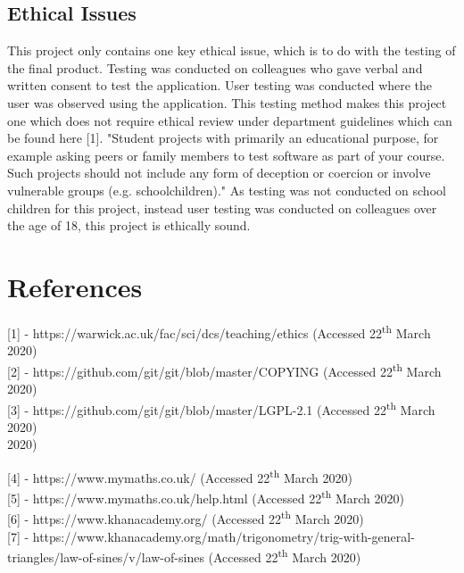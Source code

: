 \documentclass{article}
\begin{document}
\subsection{Ethical Issues}

This project only contains one key ethical issue, which is to do with the testing of the final product. Testing was conducted on colleagues who gave verbal and written consent to test the application. User testing was conducted where the user was observed using the application. This testing method makes this project one which does not require ethical review under department guidelines which can be found here [1]. "Student projects with primarily an educational purpose, for example asking peers or family members to test software as part of your course. Such projects should not include any form of deception or coercion or involve vulnerable groups (e.g. schoolchildren)." As testing was not conducted on school children for this project, instead user testing was conducted on colleagues over the age of 18, this project is ethically sound. 

\section{References}
\label{section:references}

[1] - https://warwick.ac.uk/fac/sci/dcs/teaching/ethics (Accessed 22\textsuperscript{th} March 2020) \\ 

[2] - https://github.com/git/git/blob/master/COPYING (Accessed 22\textsuperscript{th} March 2020) \\ 

[3] - https://github.com/git/git/blob/master/LGPL-2.1 (Accessed 22\textsuperscript{th} March 2020) \\  2020)

[4] - https://www.mymaths.co.uk/ (Accessed 22\textsuperscript{th} March 2020) \\ 

[5] - https://www.mymaths.co.uk/help.html (Accessed 22\textsuperscript{th} March 2020) \\

[6] - https://www.khanacademy.org/ (Accessed 22\textsuperscript{th} March 2020) \\

[7] - https://www.khanacademy.org/math/trigonometry/trig-with-general-triangles/law-of-sines/v/law-of-sines (Accessed 22\textsuperscript{th} March 2020) \\
\end{document}
